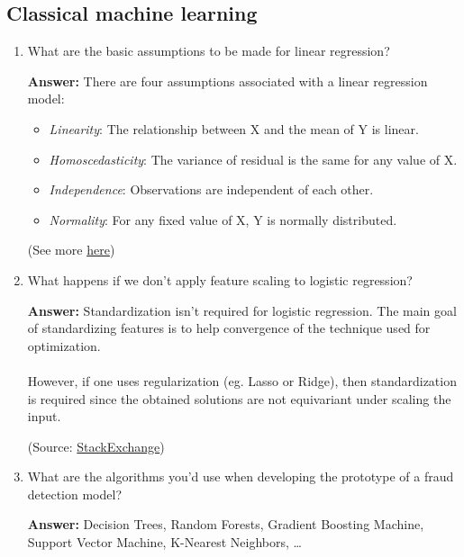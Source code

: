 \documentclass{article}
\newenvironment{QandA}{\begin{enumerate}[label=\arabic*.]}{\end{enumerate}}
\newenvironment{answer}{\par\normalfont \textbf{Answer:}}{}
\begin{document}
\subsection{Classical machine learning}
\begin{QandA}
    \item What are the basic assumptions to be made for linear regression?
    \begin{answer}
        There are four assumptions associated with a linear regression model:
        \begin{itemize}
            \item \textit{Linearity}: The relationship between X and the mean of Y is linear.
            \item \textit{Homoscedasticity}: The variance of residual is the same for any value of X.
            \item \textit{Independence}: Observations are independent of each other.
            \item \textit{Normality}: For any fixed value of X, Y is normally distributed.
        \end{itemize}
        (See more \href{https://sphweb.bumc.bu.edu/otlt/MPH-Modules/BS/R/R5_Correlation-Regression/R5_Correlation-Regression4.html}{here})
    \end{answer}

    \item What happens if we don’t apply feature scaling to logistic regression?
    \begin{answer}
        Standardization isn't required for logistic regression. The main goal of standardizing features is to help convergence of the technique used for optimization.\\\\
        However, if one uses regularization (eg. Lasso or Ridge), then standardization is required since the obtained solutions are not equivariant under scaling the input.

        (Source: \href{https://stats.stackexchange.com/questions/48360/is-standardization-needed-before-fitting-logistic-regression}{StackExchange})
    \end{answer}

    \item What are the algorithms you’d use when developing the prototype of a fraud detection model?
    \begin{answer}
        Decision Trees, Random Forests, Gradient Boosting Machine, Support Vector Machine, K-Nearest Neighbors, \ldots
    \end{answer}


\end{QandA}
\end{document}
